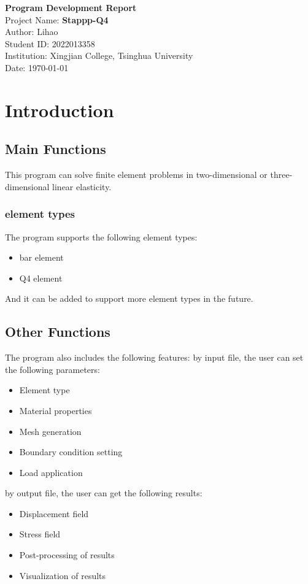 \documentclass[a4paper,12pt]{report}
\begin{document}
\begin{titlepage}
    \centering
    \vspace*{3cm}
    {\LARGE\bfseries Program Development Report}\\[1.5cm]
    {\large Project Name: \textbf{Stappp-Q4}}\\[1cm]
    {\large Author: Lihao}\\[0.5cm]
    {\large Student ID: 2022013358}\\[0.5cm]
    {\large Institution: Xingjian College, Tsinghua University}\\[1cm]
    {\large Date: \today}
    \vfill
\end{titlepage}

\tableofcontents
\newpage

\chapter{Introduction}
\section{Main Functions}

This program can solve finite element problems in two-dimensional or three-dimensional linear elasticity.

\subsection{element types}
The program supports the following element types:
\begin{itemize}
    \item bar element
    \item Q4 element
\end{itemize}
And it can be added to support more element types in the future.

\section{Other Functions}
The program also includes the following features:
by input file, the user can set the following parameters:
\begin{itemize}
    \item Element type
    \item Material properties
    \item Mesh generation
    \item Boundary condition setting
    \item Load application
\end{itemize}
    by output file, the user can get the following results:
\begin{itemize}
    \item Displacement field
    \item Stress field
    \item Post-processing of results
    \item Visualization of results
\end{itemize}
\end{document}

